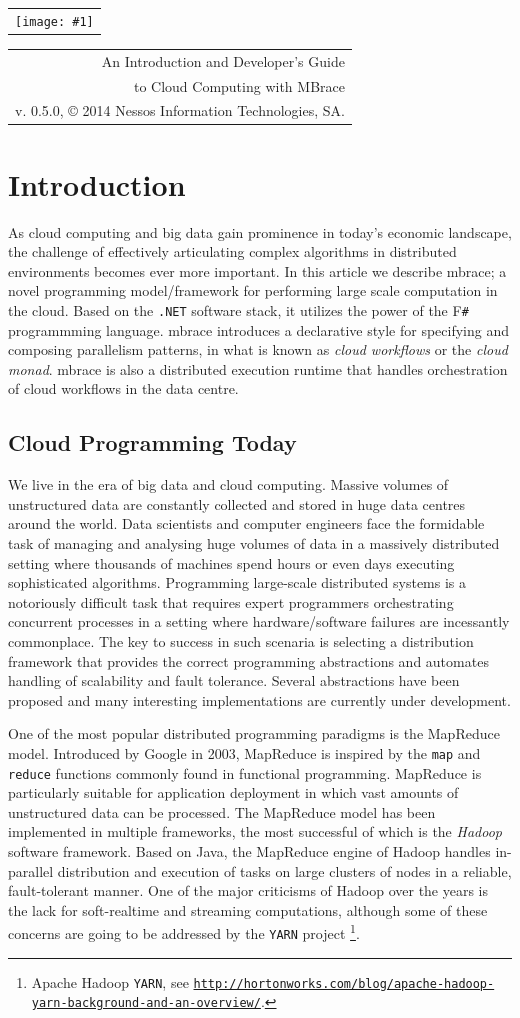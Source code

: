 \documentclass[9pt,a4paper]{article}
\makeatletter
\newcommand{\version}{0.5.0}
\newcommand{\showheader}[1]{%
%
\begin{center}
\begin{tabular}{@{} l}
\texttt{[image: \#1]}
\end{tabular}%
%
\hspace{3em}
%
\begin{tabular}{ @{\hspace{\stretch{5}}} r }
{\huge An Introduction and Developer's Guide}\\[1.2em]
{\huge to Cloud Computing with \TitularMbrace}\\[3em]
{{v\mbox{.} \version},\hspace{1em}%
\copyright{} 2014 Nessos Information Technologies, SA.}
\end{tabular}%
\end{center}%
}
\newcommand{\mbrace}{mbrace}
\newcommand{\Mbrace}{\mbrace}
\newcommand{\TitularMbrace}{MBrace}
\newcommand{\fsharp}{F\texttt \#}
\newcommand{\dotnet}{\texttt{\hbox{.}NET}}
\newcommand{\samehref}[1]{\href{#1}{\texttt{#1}}}
\makeatother
\begin{document}
%
%
\showheader{mbrace.png}
%
%
\section{Introduction}%
%
As cloud computing and big data gain prominence in today's economic landscape,
the challenge of effectively articulating complex algorithms in distributed environments
becomes ever more important.
%
In this article we describe \mbrace; a novel programming model/framework for performing
large scale computation in the cloud. Based on the \dotnet{} software stack, it utilizes
the power of the \fsharp{} programmming language.
\Mbrace{} introduces a declarative style for specifying and composing parallelism patterns,
in what is known as \emph{cloud workflows} or the \emph{cloud monad}.
\Mbrace{} is also a distributed execution runtime that handles orchestration of cloud 
workflows in the data centre.
%
\subsection{Cloud Programming Today}
%
We live in the era of big data and cloud computing. Massive volumes of unstructured 
data are constantly collected and stored in huge data centres around the world. 
Data scientists and computer engineers face the formidable task of managing and 
analysing huge volumes of data in a massively distributed setting where thousands of 
machines spend  hours or even days executing sophisticated algorithms.
Programming large-scale distributed systems is a notoriously difficult task
that requires expert programmers orchestrating concurrent processes in a setting
where hardware/\mbox{}software failures are incessantly commonplace.
The key to success in such scenaria is selecting a distribution framework that provides the
correct programming abstractions and automates handling of scalability and fault tolerance.
Several abstractions have been proposed and many interesting implementations are
currently under development.

One of the most popular distributed programming paradigms is the
MapReduce model. Introduced by Google\cite{map-reduce} in 2003, MapReduce is inspired by the \texttt{map}
and \texttt{reduce} functions commonly found in functional programming. MapReduce is
particularly suitable for application deployment in which vast amounts of unstructured
data can be processed. The MapReduce model has been implemented in multiple frameworks,
the most successful of which is the \emph{Hadoop} software framework.
Based on Java, the MapReduce engine of Hadoop handles in-parallel 
distribution and execution of tasks on large clusters of nodes in a reliable, 
fault-tolerant manner.  One of the major criticisms of Hadoop over the years is the 
lack for soft-realtime and streaming computations, although some of these concerns are 
going to be addressed by the \texttt{YARN} project%
\footnote{Apache Hadoop \texttt{YARN},
see \samehref{http://hortonworks.com/blog/apache-hadoop-yarn-background-and-an-overview/}.}. 
\end{document}
